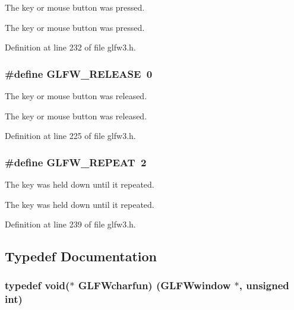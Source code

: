 The key or mouse button was pressed. 

The key or mouse button was pressed. 

Definition at line 232 of file glfw3.\+h.

\hypertarget{group__input_gada11d965c4da13090ad336e030e4d11f}{}
\subsubsection[{G\+L\+F\+W\+\_\+\+R\+E\+L\+E\+A\+S\+E}]{\setlength{\rightskip}{0pt plus 5cm}\#define G\+L\+F\+W\+\_\+\+R\+E\+L\+E\+A\+S\+E~0}\label{group__input_gada11d965c4da13090ad336e030e4d11f}


The key or mouse button was released. 

The key or mouse button was released. 

Definition at line 225 of file glfw3.\+h.

\hypertarget{group__input_gac96fd3b9fc66c6f0eebaf6532595338f}{}
\subsubsection[{G\+L\+F\+W\+\_\+\+R\+E\+P\+E\+A\+T}]{\setlength{\rightskip}{0pt plus 5cm}\#define G\+L\+F\+W\+\_\+\+R\+E\+P\+E\+A\+T~2}\label{group__input_gac96fd3b9fc66c6f0eebaf6532595338f}


The key was held down until it repeated. 

The key was held down until it repeated. 

Definition at line 239 of file glfw3.\+h.



\subsection{Typedef Documentation}
\hypertarget{group__input_gabf24451c7ceb1952bc02b17a0d5c3e5f}{}
\subsubsection[{G\+L\+F\+Wcharfun}]{\setlength{\rightskip}{0pt plus 5cm}typedef {\bf void}($\ast$  G\+L\+F\+Wcharfun) ({\bf G\+L\+F\+Wwindow} $\ast$, unsigned {\bf int})}\label{group__input_gabf24451c7ceb1952bc02b17a0d5c3e5f}


